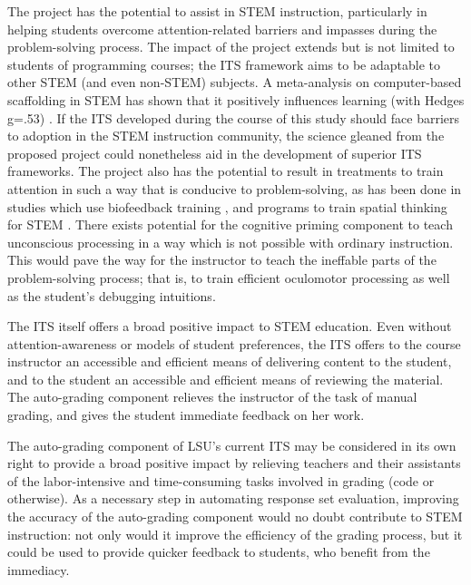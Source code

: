 \documentclass[hidelinks,11pt]{article}
\begin{document}
The project has the potential to assist in STEM instruction, particularly in
helping students overcome attention-related barriers and impasses during the
problem-solving process. The impact of the project extends but is not limited
to students of programming courses; the ITS framework aims to be adaptable to
other STEM (and even non-STEM) subjects.  A meta-analysis on computer-based
scaffolding in STEM has shown that it positively influences learning (with
Hedges g=.53) {\citep{belland2015}}.  If the ITS developed during the course of
this study should face barriers to adoption in the STEM instruction community,
the science gleaned from the proposed project could nonetheless aid in the
development of superior ITS frameworks.  The project also has the potential to
result in treatments to train attention in such a way that is conducive to
problem-solving, as has been done in studies which use biofeedback training
{\citep{li2009, li2011}}, and programs to train spatial thinking for STEM
{\citep{taylor2013}}.  There exists potential for the cognitive priming
component to teach unconscious processing in a way which is not possible with
ordinary instruction. This would pave the way for the instructor to teach the
ineffable parts of the problem-solving process; that is, to train efficient
oculomotor processing as well as the student's debugging intuitions. 

The ITS itself offers a broad positive impact to STEM education.
Even without attention-awareness or models of student preferences, the ITS
offers to the course instructor an accessible and efficient means of delivering
content to the student, and to the student an accessible and efficient means of
reviewing the material.  The auto-grading component relieves the instructor of
the task of manual grading, and gives the student immediate feedback on her
work.

The auto-grading component of LSU’s current ITS may be considered in its own
right to provide a broad positive impact by relieving teachers and their
assistants of the labor-intensive and time-consuming tasks involved in grading
(code or otherwise). As a necessary step in automating response set evaluation,
improving the accuracy of the auto-grading component would no doubt contribute
to STEM instruction: not only would it improve the efficiency of the grading
process, but it could be used to provide quicker feedback to students, who
benefit from the immediacy.  
\end{document}
